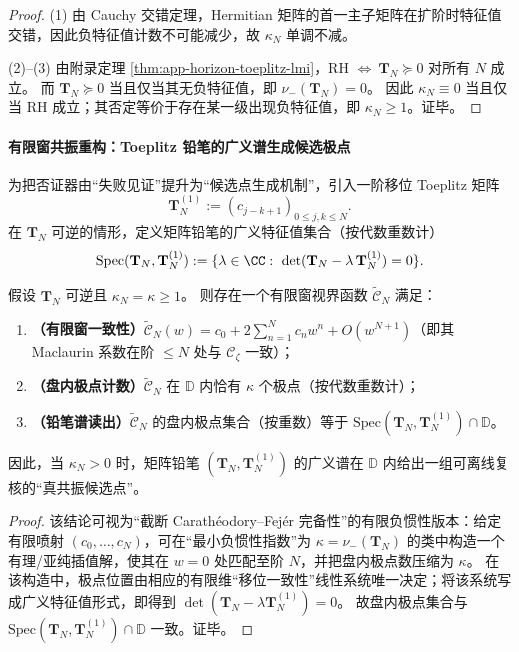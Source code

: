 \begin{proof}
(1) 由 Cauchy 交错定理，Hermitian 矩阵的首一主子矩阵在扩阶时特征值交错，因此负特征值计数不可能减少，故 \(\kappa_N\) 单调不减。
\par
(2)--(3) 由附录定理 \ref{thm:app-horizon-toeplitz-lmi}，RH \(\Longleftrightarrow\ \mathbf{T}_N\succeq 0\) 对所有 \(N\) 成立。
而 \(\mathbf{T}_N\succeq 0\) 当且仅当其无负特征值，即 \(\nu_-(\mathbf{T}_N)=0\)。
因此 \(\kappa_N\equiv 0\) 当且仅当 RH 成立；其否定等价于存在某一级出现负特征值，即 \(\kappa_N\ge 1\)。证毕。
\end{proof}

\paragraph{有限窗共振重构：Toeplitz 铅笔的广义谱生成候选极点}
为把否证器由“失败见证”提升为“候选点生成机制”，引入一阶移位 Toeplitz 矩阵
\[
\mathbf{T}_N^{(1)}:=(c_{j-k+1})_{0\le j,k\le N}.
\]
在 \(\mathbf{T}_N\) 可逆的情形，定义矩阵铅笔的广义特征值集合（按代数重数计）
\[
\mathrm{Spec}(\mathbf{T}_N,\mathbf{T}_N^{(1)})
:=\{\lambda\in\CC:\ \det(\mathbf{T}_N-\lambda\,\mathbf{T}_N^{(1)})=0\}.
\]

\begin{theorem}\label{thm:xi-resonance-pencil-reconstruction}
假设 \(\mathbf{T}_N\) 可逆且 \(\kappa_N=\kappa\ge 1\)。
则存在一个有限窗视界函数 \(\widetilde{\mathscr{C}}_{N}\) 满足：
\begin{enumerate}
  \item \textbf{（有限窗一致性）}\(\widetilde{\mathscr{C}}_{N}(w)=c_0+2\sum_{n=1}^{N}c_n w^n+O(w^{N+1})\)（即其 Maclaurin 系数在阶 \(\le N\) 处与 \(\mathscr{C}_{\zeta}\) 一致）；
  \item \textbf{（盘内极点计数）}\(\widetilde{\mathscr{C}}_{N}\) 在 \(\mathbb{D}\) 内恰有 \(\kappa\) 个极点（按代数重数计）；
  \item \textbf{（铅笔谱读出）}\(\widetilde{\mathscr{C}}_{N}\) 的盘内极点集合（按重数）等于
  \(\mathrm{Spec}(\mathbf{T}_N,\mathbf{T}_N^{(1)})\cap\mathbb{D}\)。
\end{enumerate}
因此，当 \(\kappa_N>0\) 时，矩阵铅笔 \((\mathbf{T}_N,\mathbf{T}_N^{(1)})\) 的广义谱在 \(\mathbb{D}\) 内给出一组可离线复核的“真共振候选点”。
\end{theorem}

\begin{proof}
该结论可视为“截断 Carath\'eodory--Fej\'er 完备性”的有限负惯性版本：给定有限喷射 \((c_0,\dots,c_N)\)，可在“最小负惯性指数”为 \(\kappa=\nu_-(\mathbf{T}_N)\) 的类中构造一个有理/亚纯插值解，使其在 \(w=0\) 处匹配至阶 \(N\)，并把盘内极点数压缩为 \(\kappa\)。
在该构造中，极点位置由相应的有限维“移位一致性”线性系统唯一决定；将该系统写成广义特征值形式，即得到 \(\det(\mathbf{T}_N-\lambda \mathbf{T}_N^{(1)})=0\)。
故盘内极点集合与 \(\mathrm{Spec}(\mathbf{T}_N,\mathbf{T}_N^{(1)})\cap\mathbb{D}\) 一致。证毕。
\end{proof}

